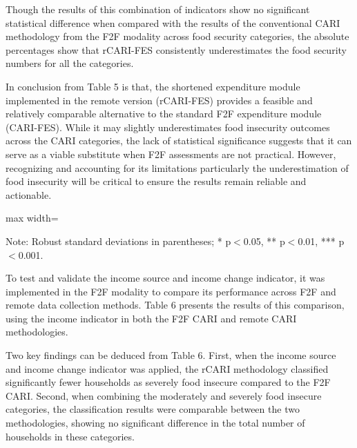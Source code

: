 \documentclass[11pt,harvard]{article}
\begin{document}
	Though the results of this combination of indicators show no significant statistical difference when compared with the results of the conventional CARI methodology from the F2F modality across food security categories, the absolute percentages show that rCARI-FES consistently underestimates the food security numbers for all the categories.
	
	In conclusion from Table 5 is that, the shortened expenditure module implemented in the remote version (rCARI-FES) provides a feasible and relatively comparable alternative to the standard F2F expenditure module (CARI-FES). While it may slightly underestimates food insecurity outcomes across the CARI categories, the lack of statistical significance suggests that it can serve as a viable substitute when F2F assessments are not practical. However, recognizing and accounting for its limitations particularly the underestimation of food insecurity will be critical to ensure the results remain reliable and actionable.


	\begin{table}[htbp]
		\centering
		\begin{adjustbox}{max width=\textwidth}
			\begin{threeparttable}
				\caption{Impact of Survey Modality: CARI-FES vs. rCARI-FES}
				\scriptsize
				 
				\label{tab:CARI_FES_rCARI_Modality_BF}
			\begin{tablenotes}
					\item Note: Robust standard deviations in parentheses; * p$<$0.05, ** p$<$0.01, *** p$<$0.001. 
				\end{tablenotes}
			\end{threeparttable}
		\end{adjustbox}
	\end{table}
	
	To test and validate the income source and income change indicator, it was implemented in the F2F modality to compare its performance across F2F and remote data collection methods. Table 6 presents the results of this comparison, using the income indicator in both the F2F CARI and remote CARI methodologies. 
	
	Two key findings can be deduced from Table 6. First, when the income source and income change indicator was applied, the rCARI methodology classified significantly fewer households as severely food insecure compared to the F2F CARI. Second, when combining the moderately and severely food insecure categories, the classification results were comparable between the two methodologies, showing no significant difference in the total number of households in these categories.
	
\end{document}
